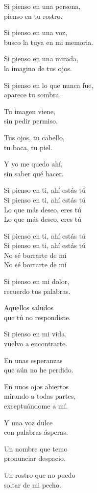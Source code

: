 \begin{lyrics}
Si pienso en una persona,\\
pienso en tu rostro.

Si pienso en una voz,\\
busco la tuya en mi memoria.

Si pienso en una mirada,\\
la imagino de tus ojos.

Si pienso en lo que nunca fue,\\
aparece tu sombra.

Tu imagen viene,\\
sin pedir permiso.

Tus ojos, tu cabello,\\
tu boca, tu piel.

Y yo me quedo ahí,\\
sin saber qué hacer.

Si pienso en ti, ahí estás tú\\
Si pienso en ti, ahí estás tú\\
Lo que más deseo, eres tú\\
Lo que más deseo, eres tú

Si pienso en ti, ahí estás tú\\
Si pienso en ti, ahí estás tú\\
No sé borrarte de mí\\
No sé borrarte de mí

Si pienso en mi dolor,\\
recuerdo tus palabras.

Aquellos saludos\\
que tú no respondiste.

Si pienso en mi vida,\\
vuelvo a encontrarte.

En unas esperanzas\\
que aún no he perdido.

En unos ojos abiertos\\
mirando a todas partes,\\
exceptuándome a mí.

Y una voz dulce\\
con palabras ásperas.

Un nombre que temo\\
pronunciar despacio.

Un rostro que no puedo\\
soltar de mi pecho.


\end{lyrics}
